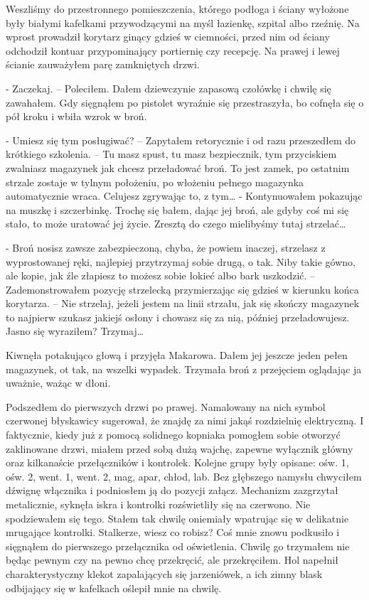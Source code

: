 \documentclass[../MAIN.tex]{subfiles}
\begin{document}
Weszliśmy do przestronnego pomieszczenia, którego podłoga i ściany wyłożone były białymi kafelkami przywodzącymi na myśl łazienkę, szpital albo rzeźnię. Na wprost prowadził korytarz ginący gdzieś w ciemności, przed nim od ściany odchodził kontuar przypominający portiernię czy recepcję. Na prawej i lewej ścianie zauważyłem parę zamkniętych drzwi.

- Zaczekaj. – Poleciłem. Dałem dziewczynie zapasową czołówkę i chwilę się zawahałem. Gdy sięgnąłem po pistolet wyraźnie się przestraszyła, bo cofnęła się o pół kroku i wbiła wzrok w broń.

- Umiesz się tym posługiwać? – Zapytałem retorycznie i od razu przeszedłem do krótkiego szkolenia. – Tu masz spust, tu masz bezpiecznik, tym przyciskiem zwalniasz magazynek jak chcesz przeładować broń. To jest zamek, po ostatnim strzale zostaje w tylnym położeniu, po włożeniu pełnego magazynka automatycznie wraca. Celujesz zgrywając to, z tym… - Kontynuowałem pokazując na muszkę i szczerbinkę. Trochę się bałem, dając jej broń, ale gdyby coś mi się stało, to może uratować jej życie. Zresztą do czego mielibyśmy tutaj strzelać…

- Broń nosisz zawsze zabezpieczoną, chyba, że powiem inaczej, strzelasz z wyprostowanej ręki, najlepiej przytrzymaj sobie drugą, o tak. Niby takie gówno, ale kopie, jak źle złapiesz to możesz sobie łokieć albo bark uszkodzić. – Zademonstrowałem pozycję strzelecką przymierzając się gdzieś w kierunku końca korytarza. – Nie strzelaj, jeżeli jestem na linii strzału, jak się skończy magazynek to najpierw szukasz jakiejś osłony i chowasz się za nią, później przeładowujesz. Jasno się wyraziłem? Trzymaj…

Kiwnęła potakująco głową i przyjęła Makarowa. Dałem jej jeszcze jeden pełen magazynek, ot tak, na wszelki wypadek. Trzymała broń z przejęciem oglądając ja uważnie, ważąc w dłoni.

Podszedłem do pierwszych drzwi po prawej. Namalowany na nich symbol czerwonej błyskawicy sugerował, że znajdę za nimi jakąś rozdzielnię elektryczną. I faktycznie, kiedy już z pomocą solidnego kopniaka pomogłem sobie otworzyć zaklinowane drzwi, miałem przed sobą dużą wajchę, zapewne wyłącznik główny oraz kilkanaście przełączników i kontrolek. Kolejne grupy były opisane: ośw. 1, ośw. 2, went. 1, went. 2, mag, apar, chłod, lab. Bez głębszego namysłu chwyciłem dźwignę włącznika i podniosłem ją do pozycji załącz. Mechanizm zazgrzytał metalicznie, syknęła iskra i kontrolki rozświetliły się na czerwono. Nie spodziewałem się tego. Stałem tak chwilę oniemiały wpatrując się w delikatnie mrugające kontrolki. Stalkerze, wiesz co robisz? Coś mnie znowu podkusiło i sięgnąłem do pierwszego przełącznika od oświetlenia. Chwilę go trzymałem nie będąc pewnym czy na pewno chcę przekręcić, ale przekręciłem. Hol napełnił charakterystyczny klekot zapalających się jarzeniówek, a ich zimny blask odbijający się w kafelkach oślepił mnie na chwilę.
\end{document}
